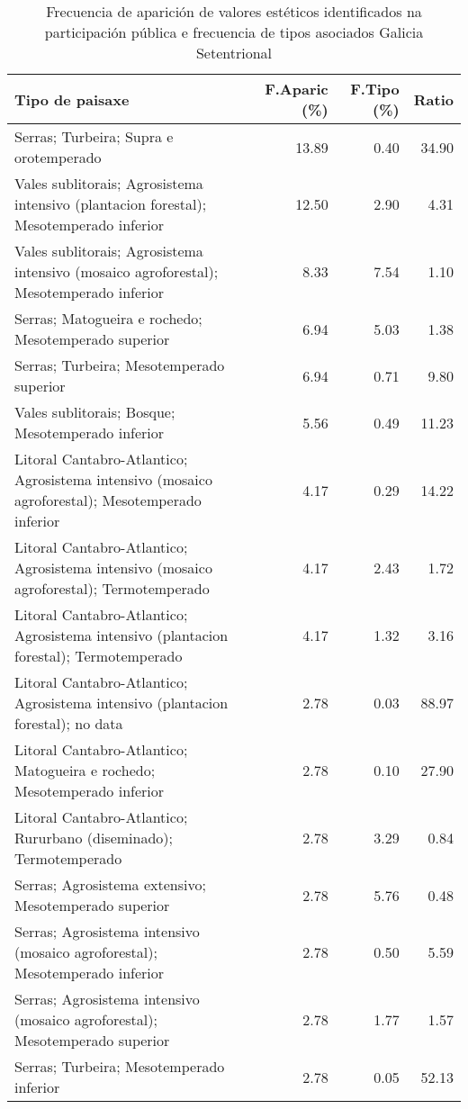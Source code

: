 \begin{table}[p]
\centering
\caption{Frecuencia de aparición de valores estéticos identificados na participación pública e frecuencia de tipos asociados Galicia Setentrional} 
\label{vsixotest10}
\begin{tabular}{lrrr}
  \hline
Tipo de paisaxe & F.Aparic (\%) & F.Tipo (\%) & Ratio \\ 
  \hline
Serras; Turbeira; Supra e orotemperado & 13.89 & 0.40 & 34.90 \\ 
  Vales sublitorais; Agrosistema intensivo (plantacion forestal); Mesotemperado inferior & 12.50 & 2.90 & 4.31 \\ 
  Vales sublitorais; Agrosistema intensivo (mosaico agroforestal); Mesotemperado inferior & 8.33 & 7.54 & 1.10 \\ 
  Serras; Matogueira e rochedo; Mesotemperado superior & 6.94 & 5.03 & 1.38 \\ 
  Serras; Turbeira; Mesotemperado superior & 6.94 & 0.71 & 9.80 \\ 
  Vales sublitorais; Bosque; Mesotemperado inferior & 5.56 & 0.49 & 11.23 \\ 
  Litoral Cantabro-Atlantico; Agrosistema intensivo (mosaico agroforestal); Mesotemperado inferior & 4.17 & 0.29 & 14.22 \\ 
  Litoral Cantabro-Atlantico; Agrosistema intensivo (mosaico agroforestal); Termotemperado & 4.17 & 2.43 & 1.72 \\ 
  Litoral Cantabro-Atlantico; Agrosistema intensivo (plantacion forestal); Termotemperado & 4.17 & 1.32 & 3.16 \\ 
  Litoral Cantabro-Atlantico; Agrosistema intensivo (plantacion forestal); no data & 2.78 & 0.03 & 88.97 \\ 
  Litoral Cantabro-Atlantico; Matogueira e rochedo; Mesotemperado inferior & 2.78 & 0.10 & 27.90 \\ 
  Litoral Cantabro-Atlantico; Rururbano (diseminado); Termotemperado & 2.78 & 3.29 & 0.84 \\ 
  Serras; Agrosistema extensivo; Mesotemperado superior & 2.78 & 5.76 & 0.48 \\ 
  Serras; Agrosistema intensivo (mosaico agroforestal); Mesotemperado inferior & 2.78 & 0.50 & 5.59 \\ 
  Serras; Agrosistema intensivo (mosaico agroforestal); Mesotemperado superior & 2.78 & 1.77 & 1.57 \\ 
  Serras; Turbeira; Mesotemperado inferior & 2.78 & 0.05 & 52.13 \\ 

\end{tabular}
\end{table}
